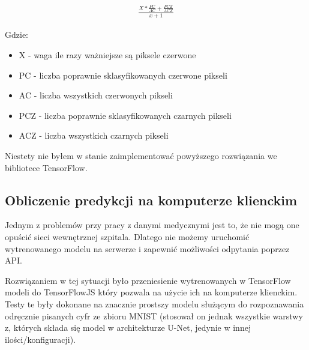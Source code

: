 \documentclass{article}
\begin{document}
\begin{align}
    \frac{X*\frac{PC}{AC} + \frac{PCZ}{ACZ}}{x+1}
\end{align}

Gdzie:
\begin{itemize}
    \item X - waga ile razy ważniejsze są piksele czerwone
    \item PC - liczba poprawnie sklasyfikowanych czerwone pikseli
    \item AC - liczba wszystkich czerwonych pikseli
    \item PCZ - liczba poprawnie sklasyfikowanych czarnych pikseli
    \item ACZ - liczba wszystkich czarnych pikseli
\end{itemize}
Niestety nie byłem w stanie zaimplementować powyższego rozwiązania we bibliotece TensorFlow.

\subsection{Obliczenie predykcji na komputerze klienckim}
Jednym z problemów przy pracy z danymi medycznymi jest to, że nie mogą one opuścić sieci wewnętrznej szpitala.
Dlatego nie możemy uruchomić wytrenowanego modelu na serwerze i zapewnić możliwości odpytania poprzez API.

Rozwiązaniem w tej sytuacji było przeniesienie wytrenowanych w TensorFlow modeli do TensorFlowJS który pozwala na użycie ich na komputerze klienckim.
Testy te były dokonane na znacznie prostszy modelu służącym do rozpoznawania odręcznie pisanych cyfr ze zbioru MNIST (stosował on jednak wszystkie warstwy z, których składa się model w architekturze U-Net, jedynie w innej ilości/konfiguracji).
\end{document}
